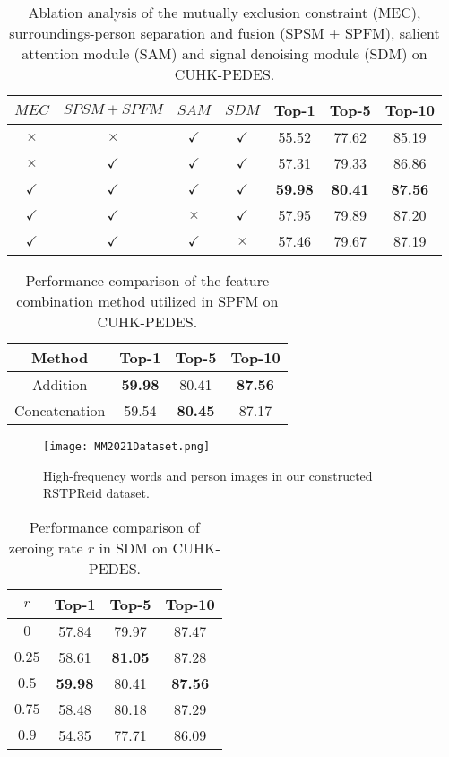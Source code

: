 \documentclass[sigconf]{acmart}
\begin{document}
\begin{table}
	\caption{Ablation analysis of the mutually exclusion constraint (MEC), surroundings-person separation and fusion (SPSM + SPFM), salient attention module (SAM) and signal denoising module (SDM) on CUHK-PEDES.}
	\label{tab:sp}
	\begin{tabular}{cc|c|c|ccc}
		\toprule
		$MEC$ & $SPSM + SPFM$ & $SAM$ & $SDM$ & Top-1 & Top-5 & Top-10 \\
		\midrule
		$\times$ & $\times$ & $\checkmark$ & $\checkmark$ & 55.52 & 77.62 & 85.19 \\
		$\times$ & $\checkmark$ & $\checkmark$ & $\checkmark$ & 57.31 & 79.33 & 86.86 \\
		\midrule
		$\checkmark$ & $\checkmark$ & $\checkmark$ & $\checkmark$ & \textbf{59.98} & \textbf{80.41} & \textbf{87.56} \\
		\midrule
		$\checkmark$ & $\checkmark$ & $\times$ & $\checkmark$ & 57.95 & 79.89 & 87.20 \\
		$\checkmark$ & $\checkmark$ & $\checkmark$ & $\times$ & 57.46 & 79.67 & 87.19 \\
		\bottomrule
	\end{tabular}
\end{table}

\begin{table}
	\caption{Performance comparison of the feature combination method utilized in SPFM on CUHK-PEDES.}
	\label{tab:catadd}
	\begin{tabular}{c|ccc}
		\toprule
		Method & Top-1 & Top-5 & Top-10 \\
		\midrule
		Addition & \textbf{59.98} & 80.41 & \textbf{87.56} \\
		Concatenation & 59.54 & \textbf{80.45} & 87.17 \\
		\bottomrule
	\end{tabular}
\end{table}

\begin{figure}[h]
	\centering
	\texttt{[image: MM2021Dataset.png]}
	\caption{High-frequency words and person images in our constructed RSTPReid dataset.}
	\label{fig:rstpreid}
\end{figure}

\begin{table}
	\caption{Performance comparison of zeroing rate $r$ in SDM on CUHK-PEDES.}
	\label{tab:DRSDM}
	\begin{tabular}{c|ccc}
		\toprule
		$r$ & Top-1 & Top-5 & Top-10 \\
		\midrule
		$0$ & 57.84 & 79.97 & 87.47 \\
		$0.25$ & 58.61 & \textbf{81.05 }& 87.28 \\
		$0.5$ & \textbf{59.98} & 80.41 & \textbf{87.56} \\
		$0.75$ & 58.48 & 80.18 & 87.29 \\
		$0.9$ & 54.35 & 77.71 & 86.09 \\
		\bottomrule
	\end{tabular}
\end{table}
\end{document}
